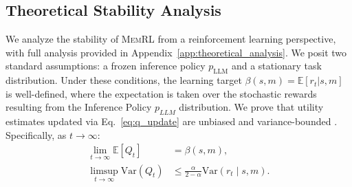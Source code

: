 \documentclass{article}
\theoremstyle{plain}
\theoremstyle{definition}
\theoremstyle{remark}
\begin{document}



\subsection{Theoretical Stability Analysis}
\label{sec:stability}

We analyze the stability of \textsc{MemRL} from a reinforcement learning perspective, with full analysis provided in Appendix~\ref{app:theoretical_analysis}. We posit two standard assumptions: a frozen inference policy $p_{\mathrm{LLM}}$ and a stationary task distribution. Under these conditions, the learning target $\beta(s,m) = \mathbb{E}[r_t | s, m]$ is well-defined, where the expectation is taken over the stochastic rewards resulting from the Inference Policy $p_{LLM}$ distribution. We prove that utility estimates updated via Eq.~\ref{eq:q_update} are unbiased and variance-bounded \citep{sutton2018reinforcement}. Specifically, as $t \to \infty$:
\begin{equation}
\label{eq:stability_summary}
\begin{aligned}
\lim_{t \to \infty} \mathbb{E}[Q_t] &= \beta(s,m), \\
\limsup_{t \to \infty} \mathrm{Var}(Q_t) 
&\le \frac{\alpha}{2-\alpha}\mathrm{Var}(r_t \mid s,m).
\end{aligned}
\end{equation}
\end{document}

